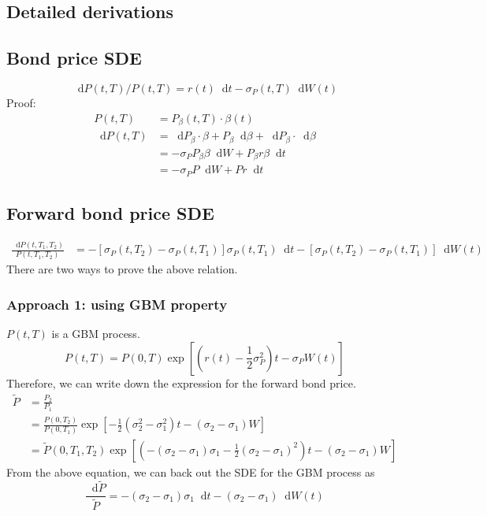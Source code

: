 \documentclass[12pt]{article}
\newcommand{\dd}{\mathop{}\!\text{d}}
\newcommand{\qBrownian}[1]{W(#1)}
\newcommand{\sigmaP}{\sigma_P}
\newcommand{\half}{\frac{1}{2}}
\begin{document}
\newpage
\appendix
\begin{appendices}
\section{Detailed derivations}
\subsection{Bond price SDE} \label{sec:bond_price_sde}
\begin{equation}
    \dd P(t, T)/P(t, T) = r(t) \dd t - \sigma_P(t, T) \dd \qBrownian{t}
\end{equation}
Proof:
\begin{align}
    P(t, T) &= P_\beta(t, T) \cdot \beta(t) \\
    \nonumber
    \dd P(t, T) &= \dd P_\beta \cdot \beta + P_\beta \dd \beta
        + \dd P_\beta \cdot \dd \beta \\
        \nonumber
        &= -\sigmaP P_\beta \beta \dd W + P_\beta r\beta \dd t \\
        &= -\sigmaP P \dd W + P r \dd t
\end{align}

\subsection{Forward bond price SDE} \label{sec:fwd_bond_price_sde}
\begin{align}
    \frac{\dd P(t, T_1, T_2)}{P(t, T_1, T_2)}
    &= -\left[\sigmaP(t, T_2) - \sigmaP(t, T_1)\right] \sigmaP(t, T_1) \dd t 
    -\left[\sigmaP(t, T_2) - \sigmaP(t, T_1)\right] \dd \qBrownian{t}
\end{align}
There are two ways to prove the above relation.

\subsubsection*{Approach 1: using GBM property}
$P(t, T)$ is a GBM process.
\begin{equation}
    P(t, T) = P(0, T) \exp \left[
        (r(t) - \half \sigmaP^2)t - \sigmaP W(t)
    \right]
\end{equation}
Therefore, we can write down the expression for the forward bond price.
\begin{align}
    \nonumber
    \tilde{P} &= \frac{P_2}{P_1} \\
    \nonumber
        &=\frac{P(0, T_2)}{P(0, T_1)} \exp\left[
            -\half (\sigma_2^2 - \sigma_1^2) t - (\sigma_2 - \sigma_1) W
        \right] \\
        &=\tilde{P}(0, T_1, T_2) \exp \left[
            \left(
                -(\sigma_2 - \sigma_1) \sigma_1 - \half (\sigma_2 - \sigma_1)^2
            \right) t - (\sigma_2 - \sigma_1) W
        \right]
\end{align}
From the above equation, we can back out the SDE for the GBM process as
\begin{equation}
    \frac{\dd \tilde{P}}{\tilde{P}} = -(\sigma_2 - \sigma_1) \sigma_1 \dd t 
        - (\sigma_2 - \sigma_1) \dd W(t)
\end{equation}


\end{appendices}
\end{document}

